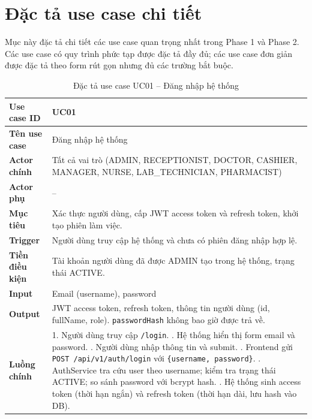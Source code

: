 \section{Đặc tả use case chi tiết}
\label{sec:srs-uc-detail}

Mục này đặc tả chi tiết các use case quan trọng nhất trong Phase 1 và Phase 2. Các use case có quy trình phức tạp được đặc tả đầy đủ; các use case đơn giản được đặc tả theo form rút gọn nhưng đủ các trường bắt buộc.

\begin{table}[H]
\centering
\caption{Đặc tả use case UC01 -- Đăng nhập hệ thống}
\label{tab:uc01}
\begin{tabularx}{\textwidth}{|p{3.6cm}|X|}
\hline
\textbf{Use case ID} & UC01 \\
\hline
\textbf{Tên use case} & Đăng nhập hệ thống \\
\hline
\textbf{Actor chính} & Tất cả vai trò (ADMIN, RECEPTIONIST, DOCTOR, CASHIER, MANAGER, NURSE, LAB\_TECHNICIAN, PHARMACIST) \\
\hline
\textbf{Actor phụ} & -- \\
\hline
\textbf{Mục tiêu} & Xác thực người dùng, cấp JWT access token và refresh token, khởi tạo phiên làm việc. \\
\hline
\textbf{Trigger} & Người dùng truy cập hệ thống và chưa có phiên đăng nhập hợp lệ. \\
\hline
\textbf{Tiền điều kiện} & Tài khoản người dùng đã được ADMIN tạo trong hệ thống, trạng thái ACTIVE. \\
\hline
\textbf{Input} & Email (username), password \\
\hline
\textbf{Output} & JWT access token, refresh token, thông tin người dùng (id, fullName, role). \texttt{passwordHash} không bao giờ được trả về. \\
\hline
\textbf{Luồng chính} &
1. Người dùng truy cập \texttt{/login}. \newline
2. Hệ thống hiển thị form email và password. \newline
3. Người dùng nhập thông tin và submit. \newline
4. Frontend gửi \texttt{POST /api/v1/auth/login} với \texttt{\{username, password\}}. \newline
5. AuthService tra cứu user theo username; kiểm tra trạng thái ACTIVE; so sánh password với bcrypt hash. \newline
6. Hệ thống sinh access token (thời hạn ngắn) và refresh token (thời hạn dài, lưu hash vào DB). \newline

\end{tabularx}
\end{table}
